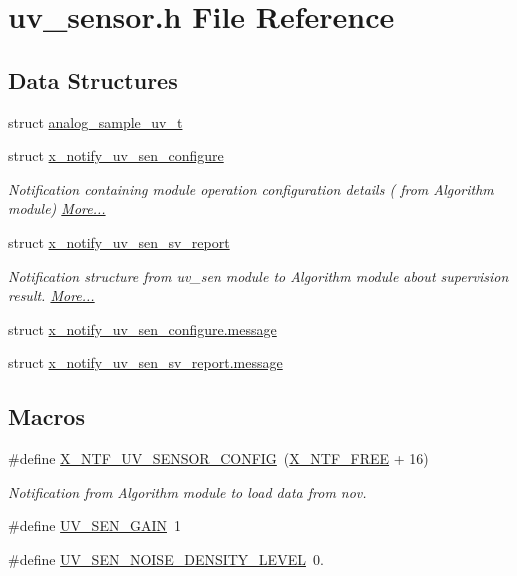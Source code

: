 \hypertarget{a00020}{\section{uv\+\_\+sensor.\+h File Reference}
\label{a00020}
}
\subsection*{Data Structures}
\begin{DoxyCompactItemize}
\item 
struct \hyperlink{a00020_dd/d6d/a00111}{analog\+\_\+sample\+\_\+uv\+\_\+t}
\item 
struct \hyperlink{a00020_dd/db2/a00866}{x\+\_\+notify\+\_\+uv\+\_\+sen\+\_\+configure}
\begin{DoxyCompactList}\small\item\em Notification containing module operation configuration details ( from Algorithm module)  \hyperlink{a00020_dd/db2/a00866}{More...}\end{DoxyCompactList}\item 
struct \hyperlink{a00020_da/d5b/a00868}{x\+\_\+notify\+\_\+uv\+\_\+sen\+\_\+sv\+\_\+report}
\begin{DoxyCompactList}\small\item\em Notification structure from uv\+\_\+sen module to Algorithm module about supervision result.  \hyperlink{a00020_da/d5b/a00868}{More...}\end{DoxyCompactList}\item 
struct \hyperlink{a00020_d2/db8/a00867}{x\+\_\+notify\+\_\+uv\+\_\+sen\+\_\+configure.\+message}
\item 
struct \hyperlink{a00020_d3/db2/a00869}{x\+\_\+notify\+\_\+uv\+\_\+sen\+\_\+sv\+\_\+report.\+message}
\end{DoxyCompactItemize}
\subsection*{Macros}
\begin{DoxyCompactItemize}
\item 
\#define \hyperlink{a00020_a08b676499fdf9649e575ed49e9197e13}{X\+\_\+\+N\+T\+F\+\_\+\+U\+V\+\_\+\+S\+E\+N\+S\+O\+R\+\_\+\+C\+O\+N\+F\+I\+G}~(\hyperlink{a00036_ab2eeea4643823a0c7c7731ddb83e3edc}{X\+\_\+\+N\+T\+F\+\_\+\+F\+R\+E\+E} + 16)
\begin{DoxyCompactList}\small\item\em Notification from Algorithm module to load data from nov. \end{DoxyCompactList}\item 
\#define \hyperlink{a00020_a6ec94a6db817afee9f5fe1f0753d18bd}{U\+V\+\_\+\+S\+E\+N\+\_\+\+G\+A\+I\+N}~1
\item 
\#define \hyperlink{a00020_a6fe600e966b9b8a62c0121805f6cbc0d}{U\+V\+\_\+\+S\+E\+N\+\_\+\+N\+O\+I\+S\+E\+\_\+\+D\+E\+N\+S\+I\+T\+Y\+\_\+\+L\+E\+V\+E\+L}~0.
\end{DoxyCompactItemize}
